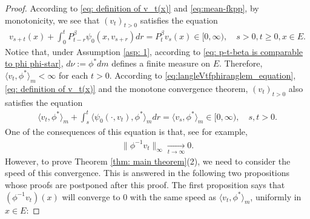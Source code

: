 \documentclass[12pt,a4paper]{amsart}
\theoremstyle{definition}
\numberwithin{equation}{section}
\begin{document}
\begin{proof}
  According to \eqref{eq: definition of v_t(x)} and \eqref{eq:mean-fkpp}, by monotonicity, we see that $(v_t)_{t > 0}$ satisfies the equation
  \begin{align}
    v_{s+t}(x) + \int_0^t P^\beta_{t-r} \psi_0(x,v_{s+r}) dr
    = P^\beta_t v_s(x)
    \in [0,\infty),
    \quad s>0, t \geq 0,x \in E.
  \end{align}
  Notice that, under Assumption \ref{asp: 1}, according to \eqref{eq: p-t-beta is comparable to phi phi-star}, $d\nu:= \phi^* dm$ defines a finite measure on $E$.
  Therefore, $\langle v_t, \phi^*\rangle_m < \infty$ for each $t>0$.
  According to \eqref{eq:langleVtfphiranglem_equation}, \eqref{eq: definition of v_t(x)} and the monotone convergence theorem, $(v_t)_{t> 0}$ also satisfies the equation
  \begin{align}
    \label{eq: equation of <vt,phi>}
    \langle v_t,\phi^*\rangle_m + \int_s^t \langle \psi_0(\cdot ,v_t) , \phi^*\rangle_m dr
    = \langle v_s,\phi^*\rangle_m
    \in [0,\infty),
    \quad s, t > 0.
  \end{align}
  One of the consequences of this equation is that, see \cite[Lemma 5.1]{RenSongSun2017Spine} for example,
  \begin{align}
    \label{eq: uniform converges to 0}
    \|\phi^{-1}v_t\|_{\infty} \xrightarrow[t\to \infty]{} 0.
  \end{align}
  However, to prove Theorem \ref{thm: main theorem}(2), we need to consider the speed of this convergence.
  This is answered in the following two propositions 
  whose proofs are postponed after this proof.
  The first proposition says that $(\phi^{-1}v_t)(x)$ will converge to $0$ with the same speed as $\langle v_t,\phi^*\rangle_m$, uniformly in $x\in E$:


\end{proof}
\end{document}
